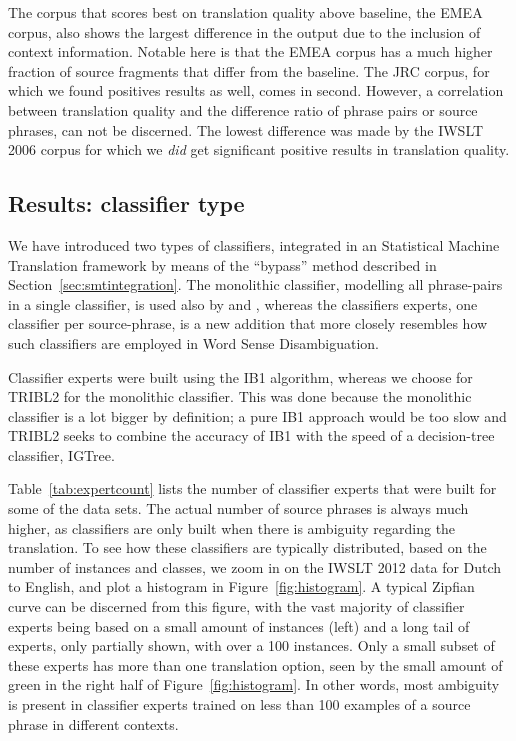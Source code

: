 \documentclass[smallextended]{svjour3}       %
\theoremstyle{break}
\begin{document}
The corpus that scores best on translation quality above baseline, the EMEA
corpus, also shows the largest difference in the output due to the inclusion of
context information. Notable here is that the EMEA corpus has a much higher fraction
of source fragments that differ from the baseline. The JRC corpus, for which we
found positives results as well, comes in second. However, a correlation
between translation quality and the difference ratio of phrase pairs or source
phrases, can not be discerned. The lowest difference was made by the IWSLT 2006
corpus for which we \emph{did} get significant positive results in translation
quality.


\subsection{Results: classifier type}
\label{sec:typeopt}

We have introduced two types of classifiers, integrated in an Statistical
Machine Translation framework by means of the ``bypass'' method described in
Section~\ref{sec:smtintegration}. The monolithic classifier, modelling all phrase-pairs
in a single classifier, is used also by \cite{Stroppa+07} and
\cite{Rejwanul+11}, whereas the classifiers experts, one classifier per
source-phrase, is a new addition that more closely resembles how such
classifiers are employed in Word Sense Disambiguation.

Classifier experts were built using the IB1 algorithm, whereas we choose for
TRIBL2 for the monolithic classifier. This was done because the monolithic
classifier is a lot bigger by definition; a pure IB1 approach would be too slow
and TRIBL2 seeks to combine the accuracy of IB1 with the speed of a
decision-tree classifier, IGTree.

Table~\ref{tab:expertcount} lists the number of classifier experts that were
built for some of the data sets. The actual number of source phrases is always
much higher, as classifiers are only built when there is ambiguity regarding
the translation. To see how these classifiers are typically distributed, based
on the number of instances and classes, we zoom in on the IWSLT 2012 data for
Dutch to English, and plot a histogram in
Figure~\ref{fig:histogram}. A typical Zipfian curve can be discerned from
this figure, with the vast majority of classifier experts being based
on a small amount of instances (left) and a long tail of experts, only
partially shown, with over a 100 instances. Only a small subset of
these experts has more than one translation option, seen by the small
amount of green in the right half of Figure~\ref{fig:histogram}. In
other words, most ambiguity is present in classifier experts trained on less than
100 examples of a source phrase in different contexts. 
\end{document}
